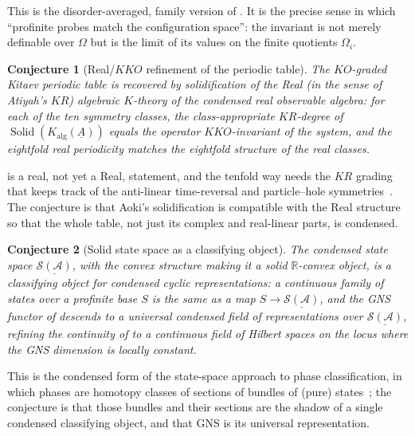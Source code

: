 \documentclass[12pt]{article}
\newcommand{\cond}[1]{\underline{#1}}          %
\newcommand{\Kalg}{K_{\mathrm{alg}}}           %
\newcommand{\Solid}{\operatorname{Solid}}      %
\newcommand{\dis}{\Omega}                       %
\newcommand{\qla}{\mathcal{A}}                  %
\newcommand{\St}{\mathcal{S}}                   %
\newcommand{\RR}{\mathbb{R}}
\theoremstyle{plain}
\newtheorem{conjecture}{Conjecture}
\begin{document}
\noindent This is the disorder-averaged, family version of .
It is the precise sense in which ``profinite probes match the configuration space'':
the invariant is not merely definable over $\dis$ but is the limit of its values on
the finite quotients $\dis_{i}$.

\begin{conjecture}[Real/$KKO$ refinement of the periodic table]
\label{conj:real}
The $KO$-graded Kitaev periodic table is recovered by solidification of the
\emph{Real} (in the sense of Atiyah's $KR$) algebraic $K$-theory of the condensed
real observable algebra: for each of the ten symmetry classes, the class-appropriate
$KR$-degree of $\Solid(\Kalg(\cond{A}))$ equals the operator $KKO$-invariant of the
system, and the eightfold real periodicity matches the eightfold structure of the
real classes.
\end{conjecture}

\noindent {} is a real, not yet a Real, statement, and the tenfold way
needs the $KR$ grading that keeps track of the anti-linear time-reversal and
particle--hole symmetries~\cite{prodan-sb,bourne-kellendonk-rennie,thiang-ktheory}.
The conjecture is that Aoki's solidification is compatible with the Real structure so
that the whole table, not just its complex and real-linear parts, is condensed.

\begin{conjecture}[Solid state space as a classifying object]
\label{conj:classifying}
The condensed state space $\cond{\St(\qla)}$, with the convex structure making it a
solid $\RR$-convex object, is a classifying object for condensed cyclic
representations: a continuous family of states over a profinite base $S$ is the same
as a map $S\to\cond{\St(\qla)}$, and the GNS functor of  descends to a
universal condensed field of representations over $\cond{\St(\qla)}$, refining the
continuity of  to a continuous field of Hilbert spaces on the
locus where the GNS dimension is locally constant.
\end{conjecture}

\noindent This is the condensed form of the state-space approach to phase
classification, in which phases are homotopy classes of sections of bundles of
(pure) states~\cite{denittis-states,denittis-rendel-weyl}; the conjecture is that
those bundles and their sections are the shadow of a single condensed classifying
object, and that GNS is its universal representation.
\end{document}
